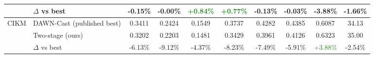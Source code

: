 \begin{table}[t]
{\begin{tabular}{l l cccccccc}
 & $\Delta$ vs best & \textcolor{BrickRed}{-0.15\%} & \textcolor{BrickRed}{-0.00\%} & \textcolor{ForestGreen}{+0.84\%} & \textcolor{ForestGreen}{+0.77\%} & \textcolor{BrickRed}{-0.13\%} & \textcolor{BrickRed}{-0.03\%} & \textcolor{BrickRed}{-3.88\%} & \textcolor{BrickRed}{-1.66\%} \\
\midrule
\multirow{3}{*}{CIKM} & DAWN-Cast (published best) & 0.3411 & 0.2424 & 0.1549 & 0.3737 & 0.4282 & 0.4385 & 0.6087 & 34.13 \\
 & Two-stage (ours) & 0.3202 & 0.2203 & 0.1481 & 0.3429 & 0.3961 & 0.4126 & 0.6323 & 35.00 \\
 & $\Delta$ vs best & \textcolor{BrickRed}{-6.13\%} & \textcolor{BrickRed}{-9.12\%} & \textcolor{BrickRed}{-4.37\%} & \textcolor{BrickRed}{-8.23\%} & \textcolor{BrickRed}{-7.49\%} & \textcolor{BrickRed}{-5.91\%} & \textcolor{ForestGreen}{+3.88\%} & \textcolor{BrickRed}{-2.54\%} \\
\bottomrule
\end{tabular}}
\end{table}
